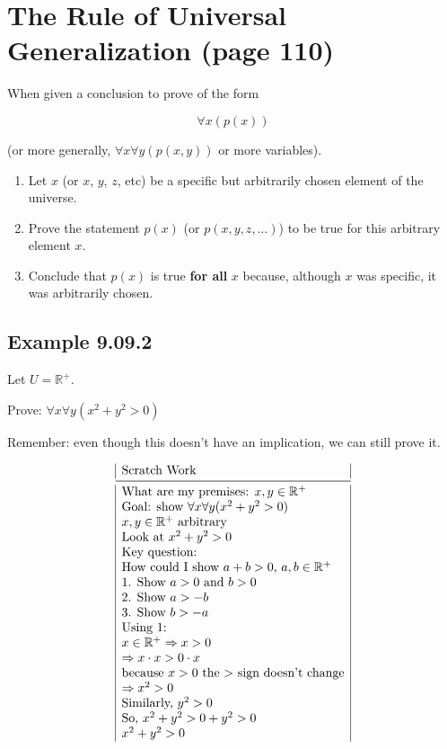 \documentclass{article}
\begin{document}
\section*{The Rule of Universal Generalization (page 110)}

When given a conclusion to prove of the form

\[
\forall x(p(x))
\]

(or more generally, $\forall{x}\forall{}y(p(x,y))$ or more variables).

\begin{enumerate}
\item Let $x$ (or $x$, $y$, $z$, etc) be a specific but arbitrarily
  chosen element of the universe.
\item Prove the statement $p(x)$ (or $p(x,y,z,\dots)$) to be true for
  this arbitrary element $x$.
\item Conclude that $p(x)$ is true \textbf{for all} $x$ because,
  although $x$ was specific, it was arbitrarily chosen.
\end{enumerate}

\subsection*{Example 9.09.2}

Let $U=\mathbb{R}^+$.

Prove: $\forall{}x\forall{}y(x^2+y^2>0)$

Remember: even though this doesn't have an implication, we can still
prove it.

\[
\begin{array}{@{}|l|@{}}
\text{Scratch Work} \\
\midrule
\text{What are my premises: $x,y\in\mathbb{R}^+$} \\
\text{Goal: show $\forall{}x\forall{}y(x^2+y^2>0)$} \\
\text{$x,y\in\mathbb{R}^+$ arbitrary} \\
\text{Look at $x^2+y^2>0$} \\
\text{Key question: } \\
\text{How could I show $a+b>0$, $a,b\in\mathbb{R}^+$} \\
\text{1. Show $a>0$ and $b>0$} \\
\text{2. Show $a>-b$} \\
\text{3. Show $b>-a$} \\
\text{Using 1:} \\
\text{$x\in\mathbb{R}^+\Rightarrow{}x>0$} \\
\text{$\Rightarrow{}x\cdot{}x>0\cdot{}x$} \\
\text{because $x>0$ the $>$ sign doesn't change} \\
\text{$\Rightarrow{}x^2>0$} \\
\text{Similarly, $y^2>0$} \\
\text{So, $x^2+y^2>0+y^2>0$} \\
\text{$x^2+y^2>0$} \\
\end{array}
\]
\end{document}
